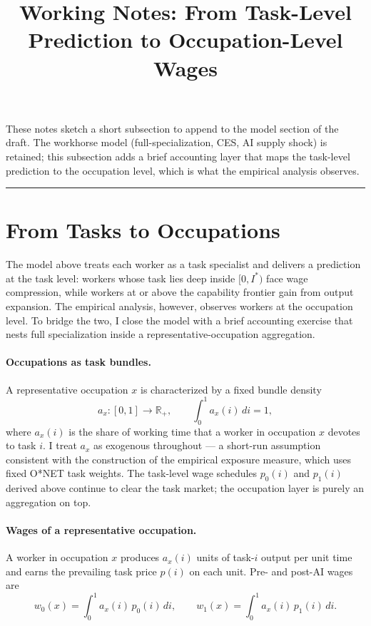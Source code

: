 \documentclass[11pt]{article}
\title{Working Notes: From Task-Level Prediction to Occupation-Level Wages}
\author{}
\date{}
\theoremstyle{plain}
\theoremstyle{remark}
\begin{document}
\maketitle
\onehalfspacing

\noindent These notes sketch a short subsection to append to the model
section of the draft.  The workhorse model (full-specialization, CES,
AI supply shock) is retained; this subsection adds a brief accounting
layer that maps the task-level prediction to the occupation level,
which is what the empirical analysis observes.

\bigskip
\hrule
\bigskip

\section*{From Tasks to Occupations}

The model above treats each worker as a task specialist and delivers a
prediction at the task level: workers whose task lies deep inside
$[0, I^*)$ face wage compression, while workers at or above the
capability frontier gain from output expansion.  The empirical analysis,
however, observes workers at the occupation level.  To bridge the two, I
close the model with a brief accounting exercise that nests
full specialization inside a representative-occupation aggregation.

\paragraph{Occupations as task bundles.}
A representative occupation $x$ is characterized by a fixed bundle density
\[
  a_x : [0,1] \to \mathbb{R}_+, \qquad \int_0^1 a_x(i)\, di = 1,
\]
where $a_x(i)$ is the share of working time that a worker in occupation
$x$ devotes to task $i$.  I treat $a_x$ as exogenous throughout --- a
short-run assumption consistent with the construction of the empirical
exposure measure, which uses fixed O*NET task weights.  The task-level
wage schedules $p_0(i)$ and $p_1(i)$ derived above continue to clear the
task market; the occupation layer is purely an aggregation on top.

\paragraph{Wages of a representative occupation.}
A worker in occupation $x$ produces $a_x(i)$ units of task-$i$ output
per unit time and earns the prevailing task price $p(i)$ on each unit.
Pre- and post-AI wages are
\begin{equation}
  w_0(x) = \int_0^1 a_x(i)\, p_0(i)\, di,
  \qquad
  w_1(x) = \int_0^1 a_x(i)\, p_1(i)\, di.
  \label{eq:occ_wages}
\end{equation}
\end{document}
